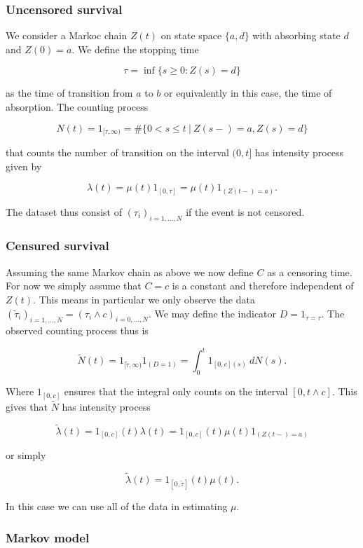 \documentclass[a4paper,10pt,openany]{book}
\begin{document}
\hypertarget{uncensored-survival}{%
\subsubsection{Uncensored survival}\label{uncensored-survival}}

We consider a Markoc chain \(Z(t)\) on state space \(\{a,d\}\) with absorbing state \(d\) and \(Z(0)=a\). We define the stopping time

\[
\tau = \inf\{s\ge 0 : Z(s)=d\}
\]

as the time of transition from \(a\) to \(b\) or equivalently in this case, the time of absorption. The counting process

\[
N(t)=1_{[\tau,\infty)}=\#\{0< s\le t\ \vert\ Z(s-)=a,Z(s)=d\}
\]

that counts the number of transition on the interval \((0,t]\) has intensity process given by

\[
\lambda (t)=\mu(t)1_{[0,\tau]}=\mu(t)1_{(Z(t-)=a)}.
\]

The dataset thus consist of \((\tau_i)_{i=1,...,N}\) if the event is not censored.

\hypertarget{censured-survival}{%
\subsubsection{Censured survival}\label{censured-survival}}

Assuming the same Markov chain as above we now define \(C\) as a censoring time. For now we simply assume that \(C=c\) is a constant and therefore independent of \(Z(t)\). This means in particular we only observe the data \((\tilde \tau_i)_{i=1,...,N}=(\tau_i \wedge c)_{i=0,...,N}\). We may define the indicator \(D=1_{\tilde \tau = \tau}\). The observed counting process thus is

\[
\tilde N(t)=1_{[\tilde \tau ,\infty)}1_{(D=1)}=\int_0^t 1_{[0,c](s)}\ dN(s).
\]

Where \(1_{[0,c]}\) ensures that the integral only counts on the interval \([0,t\wedge c]\). This gives that \(\tilde N\) has intensity process

\[
\tilde \lambda(t)=1_{[0,c]}(t)\lambda (t)=1_{[0,c]}(t)\mu(t)1_{(Z(t-)=a)}
\]

or simply

\[
\tilde \lambda(t)=1_{[0,\tilde \tau]}(t)\mu(t).
\]

In this case we can use all of the data in estimating \(\mu\).

\hypertarget{markov-model}{%
\subsubsection{Markov model}\label{markov-model}}
\end{document}
